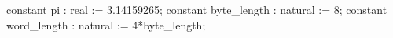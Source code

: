 constant pi : real := 3.14159265;
constant byte_length : natural := 8;
constant word_length : natural := 4*byte_length;
